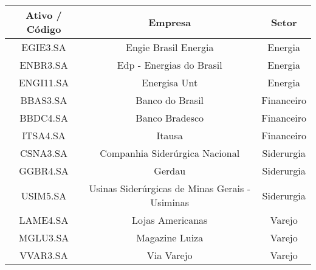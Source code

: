 \begin{table}[!h]

\begin{tabular}{ccc}
\toprule
\textbf{Ativo / Código} & \textbf{Empresa} & \textbf{Setor}\\
\midrule
EGIE3.SA & Engie Brasil Energia & Energia\\
ENBR3.SA & Edp - Energias do Brasil & Energia\\
ENGI11.SA & Energisa Unt & Energia\\
BBAS3.SA & Banco do Brasil & Financeiro\\
BBDC4.SA & Banco Bradesco & Financeiro\\
ITSA4.SA & Itausa & Financeiro\\
CSNA3.SA & Companhia Siderúrgica Nacional & Siderurgia\\
GGBR4.SA & Gerdau & Siderurgia\\
USIM5.SA & Usinas Siderúrgicas de Minas Gerais - Usiminas & Siderurgia\\
LAME4.SA & Lojas Americanas & Varejo\\
MGLU3.SA & Magazine Luiza & Varejo\\
VVAR3.SA & Via Varejo & Varejo\\
\bottomrule
\end{tabular}
\end{table}